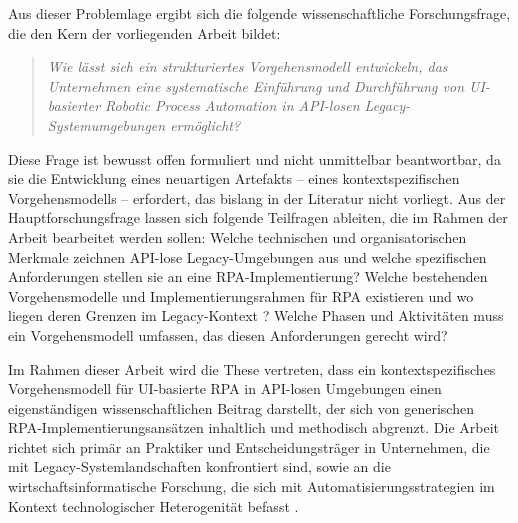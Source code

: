 Aus dieser Problemlage ergibt sich die folgende wissenschaftliche 
Forschungsfrage, die den Kern der vorliegenden Arbeit bildet:

\begin{quote}
\textit{Wie lässt sich ein strukturiertes Vorgehensmodell entwickeln, das 
Unternehmen eine systematische Einführung und Durchführung von \acs{UI}-basierter 
Robotic Process Automation in \acs{API}-losen Legacy-Systemumgebungen ermöglicht?}
\end{quote}

Diese Frage ist bewusst offen formuliert und nicht unmittelbar beantwortbar, 
da sie die Entwicklung eines neuartigen Artefakts – eines kontextspezifischen 
Vorgehensmodells – erfordert, das bislang in der Literatur nicht vorliegt. 
Aus der Hauptforschungsfrage lassen sich folgende Teilfragen ableiten, die im 
Rahmen der Arbeit bearbeitet werden sollen: Welche technischen und 
organisatorischen Merkmale zeichnen \acs{API}-lose Legacy-Umgebungen aus und welche 
spezifischen Anforderungen stellen sie an eine \acs{RPA}-Implementierung? Welche 
bestehenden Vorgehensmodelle und Implementierungsrahmen für \ac{RPA} existieren 
und wo liegen deren Grenzen im Legacy-Kontext \autocite[Vgl.][S.~1]{Wewerka2023}? Welche 
Phasen und Aktivitäten muss ein Vorgehensmodell umfassen, das diesen 
Anforderungen gerecht wird?

Im Rahmen dieser Arbeit wird die These vertreten, dass ein kontextspezifisches 
Vorgehensmodell für \acs{UI}-basierte \ac{RPA} in \acs{API}-losen Umgebungen einen 
eigenständigen wissenschaftlichen Beitrag darstellt, der sich von generischen 
\acs{RPA}-Implementierungsansätzen inhaltlich und methodisch abgrenzt. Die Arbeit 
richtet sich primär an Praktiker und Entscheidungsträger in Unternehmen, die 
mit Legacy-Systemlandschaften konfrontiert sind, sowie an die 
wirtschaftsinformatische Forschung, die sich mit Automatisierungsstrategien 
im Kontext technologischer Heterogenität befasst \autocite[Vgl.][S.~1]{Lindgren2026}.




